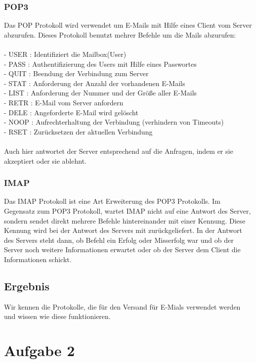 \subsubsection{POP3}
Das POP Protokoll wird verwendet um E-Mails mit Hilfe eines Client vom Server abzurufen. Dieses Protokoll benutzt mehrer Befehle um die Mails abzurufen: \\
\\
- USER : Identifiziert die Mailbox(User)\\
- PASS : Authentifizierung des Users mit Hilfe eines Passwortes\\
- QUIT :  Beendung der Verbindung zum Server\\
- STAT : Anforderung der Anzahl der vorhandenen E-Mails\\
- LIST : Anforderung der Nummer und der Größe aller E-Mails\\
- RETR : E-Mail vom Server anfordern\\
- DELE : Angeforderte E-Mail wird gelöscht\\
- NOOP : Aufrechterhaltung der Verbindung (verhindern von Timeouts)\\
- RSET : Zurücksetzen der aktuellen Verbindung\\
\\
Auch hier antwortet der Server entsprechend auf die Anfragen, indem er sie akzeptiert oder sie ablehnt.

\subsubsection{IMAP}
Das IMAP Protokoll ist eine Art Erweiterung des POP3 Protokolls. Im Gegensatz zum POP3 Protokoll, wartet IMAP nicht auf eine Antwort des Server, sondern sendet direkt mehrere Befehle hintereinander mit einer Kennung. Diese Kennung wird bei der Antwort des Servers mit zurückgeliefert. In der Antwort des Servers steht dann, ob Befehl ein Erfolg oder Misserfolg war und ob der Server noch weitere Informationen erwartet oder ob der Server dem Client die Informationen schickt. 

\subsection{Ergebnis}
Wir kennen die Protokolle, die für den Versand für E-Mials verwendet werden und wissen wie diese funktionieren.

\section{Aufgabe 2}

